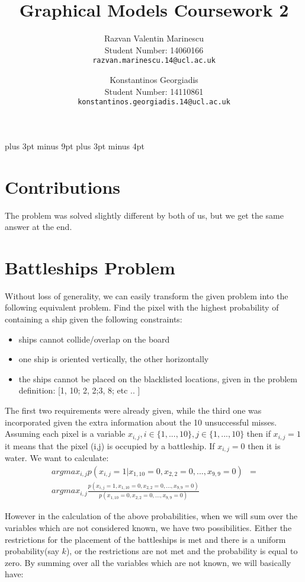 \documentclass[11pt,a4paper,oneside]{report}
\title{Graphical Models Coursework 2}
\author{
    Razvan Valentin Marinescu\\
    Student Number: 14060166\\
  \texttt{razvan.marinescu.14@ucl.ac.uk}
  \and
    Konstantinos Georgiadis\\
    Student Number: 14110861\\
  \texttt{konstantinos.georgiadis.14@ucl.ac.uk}
}
\begin{document}
\belowdisplayskip=12pt plus 3pt minus 9pt
\belowdisplayshortskip=7pt plus 3pt minus 4pt

\maketitle{}

\section*{Contributions}

The problem was solved slightly different by both of us, but we get the same answer at the end.

\section*{Battleships Problem}
Without loss of generality, we can easily transform the given problem into the following equivalent problem. Find the pixel with the highest probability of containing a ship given the following constraints:
\begin{itemize}
\item ships cannot collide/overlap on the board
\item one ship is oriented vertically, the other horizontally
\item the ships cannot be placed on the blacklisted locations, given in the problem definition: [1, 10; 2, 2;3, 8; etc .. ]
\end{itemize}
The first two requirements were already given, while the third one was incorporated given the extra information about the 10 unsuccessful misses. Assuming each pixel is a variable $x_{i,j},i\in \{1,...,10\},j\in \{1,...,10\}$ then if $x_{i,j}=1$ it means that the pixel (i,j) is occupied by a battleship. If $x_{i,j}=0$ then it is water. We want to calculate:\\

\begin{align*}
argmax_{i,j}p(x_{i,j}=1|x_{1,10}=0,x_{2,2}=0,...,x_{9,9}=0)&=\\
argmax_{i,j}\frac{p(x_{i,j}=1,x_{1,10}=0,x_{2,2}=0,...,x_{9,9}=0)}{p(x_{1,10}=0,x_{2,2}=0,...,x_{9,9}=0)}&
\end{align*}

However in the calculation of the above probabilities, when we will sum over the variables which are not considered known, we have two possibilities. Either the restrictions for the placement of the battleships is met and there is a uniform probability(say $k$), or the restrictions are not met and the probability is equal to zero. By summing over all the variables which are not known, we will basically have:
\end{document}
